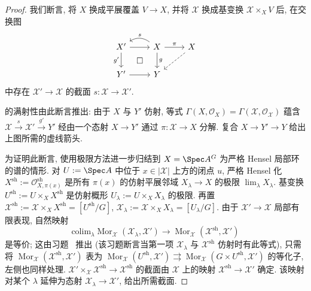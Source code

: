 \begin{proof}
我们断言, 将 $X$ 换成平展覆盖 $V\to X$, 并将 $\mathcal X$ 换成基变换 $\mathcal X\times_X V$ 后, 在交换图
\[
\begin{tikzcd}
\mathcal X'\arrow[r]\arrow[d,"{g'}"']&\mathcal X\arrow[l,bend right=35,"s"']\arrow[r,"\pi"]\arrow[d,"g"]&X\arrow[dl,dashed]\\
Y'\arrow[r]\arrow[ur,phantom,"\square" description]&Y&
\end{tikzcd}
\]
中存在 $\mathcal X'\to\mathcal X$ 的截面 $s:\mathcal X\to\mathcal X'$.

 的满射性由此断言推出: 由于 $X$ 与 $Y'$ 仿射, 等式 $\Gamma(X,\mathcal O_X)=\Gamma(\mathcal X,\mathcal O_{\mathcal X})$ 蕴含 $\mathcal X\xrightarrow{s}\mathcal X'\xrightarrow{g'}Y'$ 经由一个态射 $X\to Y'$ 通过 $\pi:\mathcal X\to X$ 分解. 复合 $X\to Y'\to Y$ 给出上图所需的虚线箭头.

为证明此断言, 使用极限方法进一步归结到 $X=\Spec A^G$ 为严格 Hensel 局部环的谱的情形. 对 $U:=\Spec A$ 中位于 $x\in|\mathcal X|$ 上方的闭点 $u$, 严格 Hensel 化 $X^{\mathrm{sh}}:=\mathcal O^{\mathrm{sh}}_{X,\pi(x)}$ 是所有 $\pi(x)$ 的仿射平展邻域 $X_\lambda\to X$ 的极限 $\lim_\lambda X_\lambda$. 基变换 $U^{\mathrm{sh}}:=U\times_X X^{\mathrm{sh}}$ 是仿射概形 $U_\lambda:=U\times_X X_\lambda$ 的极限. 再置 $\mathcal X^{\mathrm{sh}}:=\mathcal X\times_X X^{\mathrm{sh}}=[U^{\mathrm{sh}}/G]$, $\mathcal X_\lambda:=\mathcal X\times_X X_\lambda=[U_\lambda/G]$. 由于 $\mathcal X'\to\mathcal X$ 局部有限表现, 自然映射
\[
\mathrm{colim}_\lambda\operatorname{Mor}_{\mathcal X}(\mathcal X_\lambda,\mathcal X')\longrightarrow\operatorname{Mor}_{\mathcal X}(\mathcal X^{\mathrm{sh}},\mathcal X')
\]
是等价; 这由习题~ 推出 (该习题断言当第一项 $\mathcal X_\lambda$ 与 $\mathcal X^{\mathrm{sh}}$ 仿射时有此等式), 只需将 $\operatorname{Mor}_{\mathcal X}(\mathcal X^{\mathrm{sh}},\mathcal X')$ 表为 $\operatorname{Mor}_{\mathcal X}(U^{\mathrm{sh}},\mathcal X')\rightrightarrows\operatorname{Mor}_{\mathcal X}(G\times U^{\mathrm{sh}},\mathcal X')$ 的等化子, 左侧也同样处理. $\mathcal X'\times_{\mathcal X}\mathcal X^{\mathrm{sh}}\to\mathcal X^{\mathrm{sh}}$ 的截面由 $\mathcal X$ 上的映射 $\mathcal X^{\mathrm{sh}}\to\mathcal X'$ 确定. 该映射对某个 $\lambda$ 延伸为态射 $\mathcal X_\lambda\to\mathcal X'$, 给出所需截面.


\end{proof}
